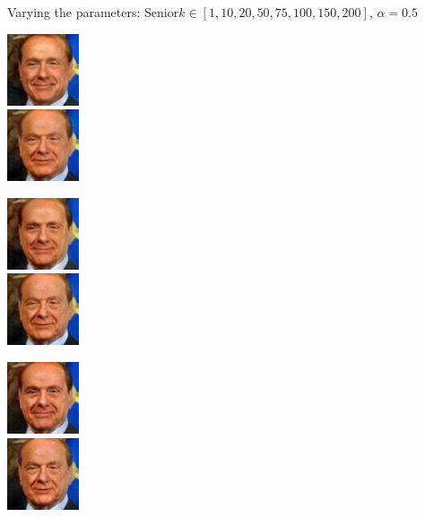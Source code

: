 \documentclass[11pt]{beamer}
\begin{document}
\begin{frame}{Varying the parameters: Senior}{$k \in [1, 10, 20, 50, 75, 100, 150, 200]$, $\alpha=0.5$}
	\centering
	\begin{minipage}{81px}
		\includegraphics[width=80px]{../pictures/outputs/alpha_k/Senior/alpha0.5/Silvio_Berlusconi_0023_alpha-0.5_k-12017-02-07_14-20-42.png}\\
		\includegraphics[width=80px]{../pictures/outputs/alpha_k/Senior/alpha0.5/Silvio_Berlusconi_0023_alpha-0.5_k-752017-02-07_14-26-56.png}
	\end{minipage}%
	\begin{minipage}{81px}
		\includegraphics[width=80px]{../pictures/outputs/alpha_k/Senior/alpha0.5/Silvio_Berlusconi_0023_alpha-0.5_k-102017-02-07_14-22-13.png}\\
		\includegraphics[width=80px]{../pictures/outputs/alpha_k/Senior/alpha0.5/Silvio_Berlusconi_0023_alpha-0.5_k-1002017-02-07_14-28-35.png}
	\end{minipage}%
	\begin{minipage}{81px}
		\includegraphics[width=80px]{../pictures/outputs/alpha_k/Senior/alpha0.5/Silvio_Berlusconi_0023_alpha-0.5_k-202017-02-07_14-23-45.png}\\
		\includegraphics[width=80px]{../pictures/outputs/alpha_k/Senior/alpha0.5/Silvio_Berlusconi_0023_alpha-0.5_k-1502017-02-07_14-30-17.png}

\end{minipage}
\end{frame}
\end{document}
